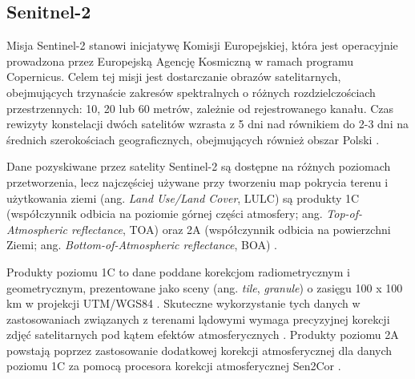 \documentclass{amuthesis}
\begin{document}
\hypertarget{sec-sentinel2}{%
\subsection{Senitnel-2}\label{sec-sentinel2}}

Misja Sentinel-2 stanowi inicjatywę Komisji Europejskiej, która jest
operacyjnie prowadzona przez Europejską Agencję Kosmiczną w ramach
programu Copernicus. Celem tej misji jest dostarczanie obrazów
satelitarnych, obejmujących trzynaście zakresów spektralnych o różnych
rozdzielczościach przestrzennych: 10, 20 lub 60 metrów, zależnie od
rejestrowanego kanału. Czas rewizyty konstelacji dwóch satelitów wzrasta
z 5 dni nad równikiem do 2-3 dni na średnich szerokościach
geograficznych, obejmujących również obszar Polski
\autocite{hejmanowska_2020_dane,sentinel_2_guide}.

Dane pozyskiwane przez satelity Sentinel-2 są dostępne na różnych
poziomach przetworzenia, lecz najczęściej używane przy tworzeniu map
pokrycia terenu i użytkowania ziemi (ang. \emph{Land Use/Land Cover},
LULC) są produkty 1C (współczynnik odbicia na poziomie górnej części
atmosfery; ang. \emph{Top-of-Atmospheric reflectance}, TOA) oraz 2A
(współczynnik odbicia na powierzchni Ziemi; ang.
\emph{Bottom-of-Atmospheric reflectance}, BOA)
\autocite{phiri_2020_sentinel2}.

Produkty poziomu 1C to dane poddane korekcjom radiometrycznym i
geometrycznym, prezentowane jako sceny (ang. \emph{tile},
\emph{granule}) o zasięgu 100 x 100 km w projekcji UTM/WGS84
\autocite{esa_2015_sentinel2handbook}. Skuteczne wykorzystanie tych
danych w zastosowaniach związanych z terenami lądowymi wymaga
precyzyjnej korekcji zdjęć satelitarnych pod kątem efektów
atmosferycznych \autocite{main-knorn_2017_Sen2Cor}. Produkty poziomu 2A
powstają poprzez zastosowanie dodatkowej korekcji atmosferycznej dla
danych poziomu 1C za pomocą procesora korekcji atmosferycznej Sen2Cor
\autocite{main-knorn_2017_Sen2Cor}.
\end{document}

